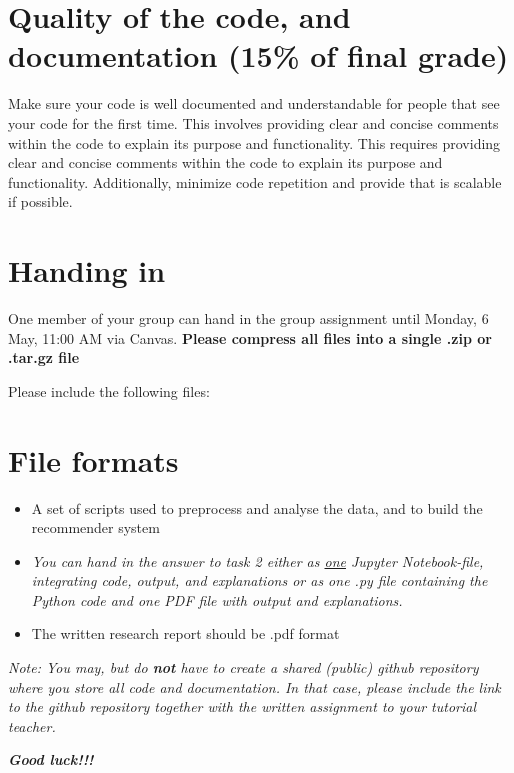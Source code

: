 \section{Quality of the code, and documentation (15\% of final grade)}

Make sure your code is well documented and understandable for people that see your code for the first time. This involves providing clear and concise comments within the code to explain its purpose and functionality.
This requires providing clear and concise comments within the code to explain its purpose and functionality. Additionally, minimize code repetition and provide that is scalable if possible. 

\section{Handing in}
One member of your group can hand in the group assignment until Monday, 6 May, 11:00 AM via Canvas. \textbf{Please compress all files into a single .zip or .tar.gz file} 

Please include the following files:   
\section*{File formats}

\begin{itemize}
	\item  A set of scripts used to preprocess and analyse the data, and to build the recommender system
	\item \emph{
		You can hand in the answer to task 2 \emph{either} as \underline{one} Jupyter Notebook-file, integrating code, output, and explanations \emph{or} as one .py file containing the Python code and one PDF file with output and explanations.
	}
	\item The written research report should be .pdf format
\end{itemize}

\emph{Note: You may, but do \textbf{not} have to create a shared (public) github repository where you store all code and documentation. In that case, please include the link to the github repository together with the written assignment to your tutorial teacher.}

\textbf{\emph{Good luck!!!}}